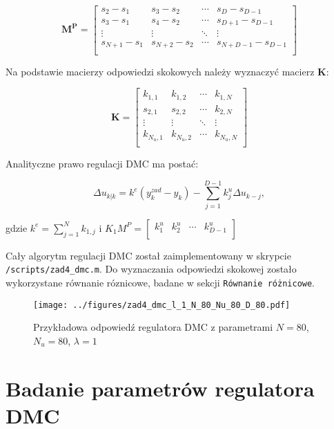 \documentclass[a4paper,titlepage,11pt,floatssmall]{mwrep}
\begin{document}
$$
\mathbf{M^{P}} =
\left[ \begin{array}{cccc}
s_2 - s_1 & s_3 - s_2 & \cdots & s_D - s_{D-1}  \\
s_3 - s_1 & s_4 - s_2 & \cdots & s_{D+1} - s_{D-1} \\
\vdots & \vdots & \ddots &  \vdots \\
s_{N+1} - s_1 & s_{N+2} - s_2 & \cdots & s_{N + D - 1} - s_{D-1}\\
\end{array} \right]
$$

Na podstawie macierzy odpowiedzi skokowych należy wyznaczyć macierz $\mathbf{K}$:

$$
\mathbf{K} =
\left[ \begin{array}{cccc}
k_{1,1} & k_{1,2} & \cdots & k_{1,N} \\
s_{2,1} & s_{2,2} & \cdots & k_{2,N} \\
\vdots & \vdots & \ddots & \vdots  \\
k_{N_u,1} & k_{N_u,2} & \cdots & k_{N_u,N}\\
\end{array} \right]
$$

Analityczne prawo regulacji DMC ma postać:

\begin{equation*}
\Delta u_{k|k} = k^{e}(y_k^{zad} - y_k) -\sum_{j=1}^{D-1} k_j^u \Delta u_{k-j},
\end{equation*}
\begin{center}
gdzie $k^{e} = \sum_{j=1}^{N} k_{1,j} $ i $
K_{1}M^{P} =
\left[ \begin{array}{cccc}
k_{1}^u & k_{2}^u & \cdots & k_{D-1}^u \\
\end{array} \right]
$
\end{center}

\bigskip
Cały algorytm regulacji DMC został zaimplementowany w skrypcie \texttt{/scripts/zad4\_{}dmc.m}. Do wyznaczania odpowiedzi skokowej zostało wykorzystane równanie róznicowe, badane w sekcji \texttt{Równanie różnicowe}.


\begin{figure}[H]
\centering
\texttt{[image: ../figures/zad4\_dmc\_l\_1\_N\_80\_Nu\_80\_D\_80.pdf]}
\caption{Przykładowa odpowiedź regulatora DMC z parametrami $N = 80$, $N_u = 80$, $\lambda = 1$}
\end{figure}


\section{Badanie parametrów regulatora DMC}
\end{document}
